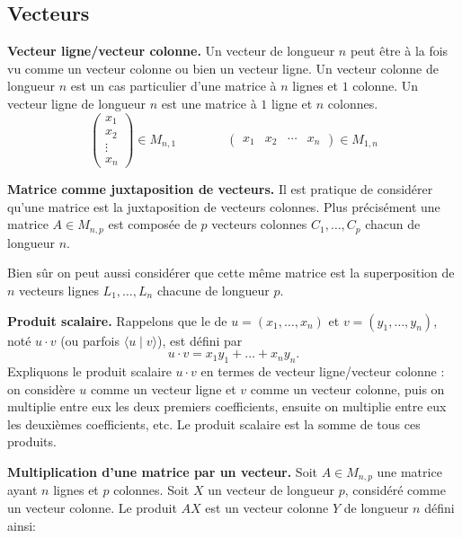 \documentclass[11pt,class=report,crop=false]{standalone}
\begin{document}
\subsection{Vecteurs}

\textbf{Vecteur ligne/vecteur colonne.}
Un vecteur de longueur $n$ peut être à la fois vu comme un vecteur colonne ou bien un vecteur ligne.
Un vecteur colonne de longueur $n$ est un cas particulier d'une matrice à $n$ lignes et $1$ colonne.
Un vecteur ligne de longueur $n$ est une matrice à $1$ ligne et $n$ colonnes.
$$\begin{pmatrix} x_1\\ x_2 \\ \vdots \\ x_n \end{pmatrix} \in M_{n,1}
\qquad \qquad 
\begin{pmatrix} x_1 & x_2 & \cdots & x_n \end{pmatrix} \in M_{1,n}
$$


\textbf{Matrice comme juxtaposition de vecteurs.}
Il est pratique de considérer qu'une matrice est la juxtaposition de vecteurs colonnes. Plus précisément une matrice $A \in M_{n,p}$ est composée de $p$ vecteurs colonnes $C_1,\ldots,C_p$ chacun de longueur $n$.




Bien sûr on peut aussi considérer que cette même matrice est la superposition de $n$ vecteurs lignes $L_1,\ldots,L_n$ chacune de longueur $p$.


\textbf{Produit scalaire.}
Rappelons que le  de $u=(x_1,\ldots ,x_n)$ et $v=(y_1,\ldots ,y_n)$, noté $u \cdot v$ (ou parfois $\langle u \mid v\rangle$), est défini par
$$u \cdot v= x_1y_1+\dots +x_ny_n.$$
Expliquons le produit scalaire $u \cdot v$ en termes de vecteur ligne/vecteur colonne : on considère $u$ comme un vecteur ligne et $v$ comme un vecteur colonne, puis on multiplie entre eux les deux premiers coefficients, ensuite on multiplie entre eux les deuxièmes coefficients, etc. Le produit scalaire est la somme de tous ces produits.



\textbf{Multiplication d'une matrice par un vecteur.}
Soit $A \in M_{n,p}$ une matrice ayant $n$ lignes et $p$ colonnes.
Soit $X$ un vecteur de longueur $p$, considéré comme un vecteur colonne.
Le produit $AX$ est un vecteur colonne $Y$ de longueur $n$ défini ainsi:
\end{document}
